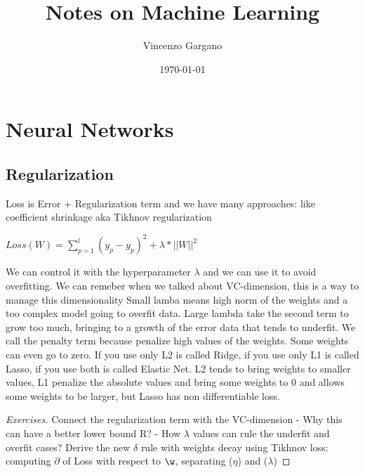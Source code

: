 \documentclass[12pt]{book}
\title{Notes on Machine Learning}
\author{Vincenzo Gargano}
\begin{document}

\date{\today}

\maketitle

\tableofcontents
\clearpage

\chapter{Neural Networks}

\section{Regularization}

Loss is Error + Regularization term and we have many approaches: like coefficient shrinkage aka Tikhnov regularization
\newline\newline

$ Loss(W) = \sum_{p=1}^l (y_p - y_p)^2 + \lambda * ||W||^2 $ \newline


We can control it with the hyperparameter $\lambda$ and we can use it to avoid overfitting. We can remeber when we talked about VC-dimension, this is a way to manage this dimensionality
\newline\newline
Small lamba means high norm of the weights and a too complex model going to overfit data.
Large lambda take the second term to grow too much, bringing to a growth of the error data that tends to underfit.
We call the penalty term because penalize high values of the weights. Some weights can even go to zero.
If you use only L2 is called Ridge, if you use only L1 is called Lasso, if you use both is called Elastic Net.
L2 tends to bring weights to smaller values, L1 penalize the absolute values and bring some weights to 0 and allows some weights to be larger, but Lasso has non differentiable loss.

\clearpage

\begin{proof}[Exercises]
Connect the regularization term with the VC-dimension \newline
- Why this can have a better lower bound R? \newline
- How $\lambda$ values can rule the underfit and overfit cases? \newline
Derive the new $\delta$ rule with weights decay using Tikhnov loss: computing $\partial$ of Loss with respect to $\w$, separating ($\eta$) and ($\lambda$) \newline
\end{proof}
\end{document}
